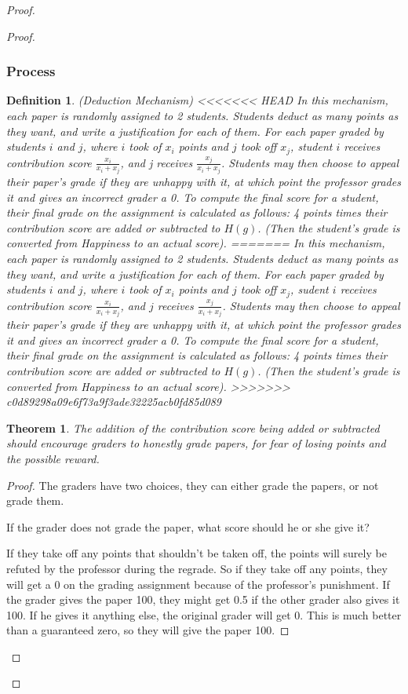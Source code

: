 \documentclass[12pt, Arial]{article}
\newtheorem{theorem}{Theorem}
\newtheorem{definition}{Definition}
\begin{document}
\begin{proof}
\begin{proof}
\subsubsection{Process}
\begin{definition}(Deduction Mechanism)
<<<<<<< HEAD
In this mechanism, each paper is randomly assigned to 2 students. Students deduct as many points as they want, and write a justification for each of them. For each paper graded by students $i$ and $j$, where $i$ took of $x_i$ points and $j$ took off $x_j$, student $i$ receives contribution score $\frac{x_i}{x_i + x_j}$, and j receives $\frac{x_j}{x_i + x_j}$. Students may then choose to appeal their paper's grade if they are unhappy with it, at which point the professor grades it and gives an incorrect grader a 0. To compute the final score for a student, their final grade on the assignment is calculated as follows: 4 points times their contribution score are added or subtracted to $H(g)$. (Then the student’s grade is converted from Happiness to an actual score).
=======
In this mechanism, each paper is randomly assigned to 2 students. Students deduct as many points as they want, and write a justification for each of them. For each paper graded by students $i$ and $j$, where $i$ took of $x_i$ points and $j$ took off $x_j$, sudent $i$ receives contribution score $\frac{x_i}{x_i + x_j}$, and $j$ receives $\frac{x_j}{x_i + x_j}$. Students may then choose to appeal their paper's grade if they are unhappy with it, at which point the professor grades it and gives an incorrect grader a 0. To compute the final score for a student, their final grade on the assignment is calculated as follows: 4 points times their contribution score are added or subtracted to $H(g)$. (Then the student’s grade is converted from Happiness to an actual score).
>>>>>>> c0d89298a09e6f73a9f3ade32225acb0fd85d089
\end{definition}
\begin{theorem}
The addition of the contribution score being added or subtracted should encourage graders to honestly grade papers, for fear of losing points and the possible reward.
\end{theorem}
\begin{proof}
The graders have two choices, they can either grade the papers, or not grade them.

If the grader does not grade the paper, what score should he or she give it?

If they take off any points that shouldn't be taken off, the points will surely be refuted by the professor during the regrade.
So if they take off any points, they will get a 0 on the grading assignment because of the professor's punishment.
If the grader gives the paper 100, they might get 0.5 if the other grader also gives it 100. If he gives it anything else, the original grader will get 0. This is much better than a guaranteed zero, so they will give the paper 100.


\end{proof}
\end{proof}
\end{proof}
\end{document}
